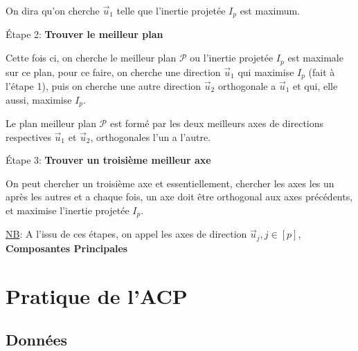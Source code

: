 \documentclass{article}
\begin{document}
On dira qu’on cherche $\vec{u}_1$ telle que l’inertie projetée $I_p$ est maximum.

\begin{flushleft}
Étape 2: \textbf{Trouver le meilleur plan}
\end{flushleft}

Cette fois ci, on cherche le meilleur plan $\mathcal{P}$ ou l'inertie projetée $I_p$ est maximale sur ce plan, pour ce faire, on cherche une direction $\vec{u}_1$ qui maximise $I_p$ (fait à l'étape 1), puis on cherche une autre direction $\vec{u}_2$ orthogonale a $\vec{u}_1$ et qui, elle aussi, maximise $I_p$.
\newline

Le plan meilleur plan $\mathcal{P}$ est formé par les deux meilleurs axes de directions respectives $\vec{u}_1$ et $\vec{u}_2$, orthogonales l'un a l'autre.

\begin{flushleft}
Étape 3: \textbf{Trouver un troisième meilleur axe}
\end{flushleft}

On peut chercher un troisième axe et essentiellement, chercher les axes les un après les autres et a chaque fois, un axe doit être orthogonal aux axes précédents, et maximise l'inertie projetée $I_p$.
\newline

\begin{flushleft}
\underline{NB}: A l'issu de ces étapes, on appel les axes de direction $\vec{u}_j,j \in [p]$, \textbf{Composantes Principales}
\end{flushleft}

\newpage

\section{Pratique de l'ACP}

\subsection{Données}
\end{document}
